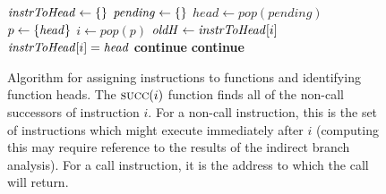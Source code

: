 \begin{figure}
\begin{algorithmic}[1]
  \State $\mathit{instrToHead} \gets \{\}$
  \State $\mathit{pending} \gets \{\}$
    \State $\mathit{head} \gets \mathit{pop}(\mathit{pending})$
    \State $p \gets \{\mathit{head}\}$
      \State $i \gets \mathit{pop}(p)$
      \State $\mathit{oldH} \gets \mathit{instrToHead}[i]$
       
        \State $\mathit{instrToHead}[i] = \mathit{head}$
        \EndIf
       
        \State \textbf{continue}
       
        \State \textbf{continue}
      \Else {}
      \EndIf
    \EndWhile
  \EndWhile
\end{algorithmic}
\caption{Algorithm for assigning instructions to functions and
  identifying function heads.  The $\textsc{succ}(i)$ function finds
  all of the non-call successors of instruction $i$.  For a non-call
  instruction, this is the set of instructions which might execute
  immediately after $i$ (computing this may require reference to the
  results of the indirect branch analysis).  For a call instruction,
  it is the address to which the call will return. }
\label{fig:function_head_alg}
\end{figure}

